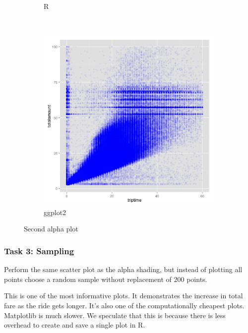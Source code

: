 \documentclass[]{article}
\begin{document}
\begin{figure}
\begin{subfigure}[b]{0.3\textwidth}
                \caption{R}
        \end{subfigure}
        ~ %
        \begin{subfigure}[b]{0.3\textwidth}
                \includegraphics[width=\textwidth]{ggplot2/alpha2.png}
                \caption{ggplot2}
        \end{subfigure}
        \caption{Second alpha plot}
\end{figure}


\subsubsection{Task 3: Sampling}\label{task-3-sampling}

Perform the same scatter plot as the alpha shading, but instead of
plotting all points choose a random sample without replacement of 200
points.

This is one of the most informative plots. It demonstrates the increase
in total fare as the ride gets longer. It's also one of the
computationally cheapest plots. Matplotlib is much slower. We speculate
that this is because there is less overhead to create and save a single
plot in R.
\end{document}
